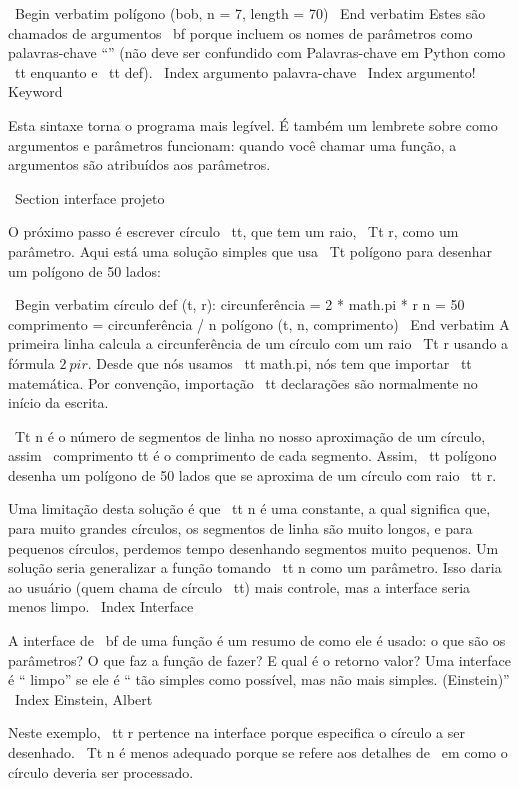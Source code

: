 \documentclass[10pt]{book}
\begin{document}
{\ Begin {verbatim}
polígono (bob, n = 7, length = 70)
\ End {verbatim}
%
Estes são chamados de argumentos {\ bf} porque incluem
os nomes de parâmetros como palavras-chave ``'' (não deve ser confundido com
Palavras-chave em Python como {\ tt enquanto} e {\ tt def}).
\ Index {argumento palavra-chave}
\ Index {argumento! Keyword}

Esta sintaxe torna o programa mais legível. É também um lembrete
sobre como argumentos e parâmetros funcionam: quando você chamar uma função, a
argumentos são atribuídos aos parâmetros.


\ Section {interface} projeto

O próximo passo é escrever {círculo \ tt}, que tem um raio,
{\ Tt r}, como um parâmetro. Aqui está uma solução simples que usa
{\ Tt polígono} para desenhar um polígono de 50 lados:

\ Begin {verbatim}
círculo def (t, r):
    circunferência = 2 * math.pi * r
    n = 50
    comprimento = circunferência / n
    polígono (t, n, comprimento)
\ End {verbatim}
%
A primeira linha calcula a circunferência de um círculo com um raio
{\ Tt r} usando a fórmula $ 2 \ pi r $. Desde que nós usamos {\ tt math.pi}, nós
tem que importar {\ tt matemática}. Por convenção, {importação \ tt} declarações
são normalmente no início da escrita.

{\ Tt n} é o número de segmentos de linha no nosso aproximação de um círculo,
assim {\ comprimento tt} é o comprimento de cada segmento. Assim, {\ tt polígono}
desenha um polígono de 50 lados que se aproxima de um círculo com raio {\ tt r}.

Uma limitação desta solução é que {\ tt n} é uma constante, a qual
significa que, para muito grandes círculos, os segmentos de linha são muito longos, e
para pequenos círculos, perdemos tempo desenhando segmentos muito pequenos. Um
solução seria generalizar a função tomando {\ tt n} como
um parâmetro. Isso daria ao usuário (quem chama de círculo {\ tt})
mais controle, mas a interface seria menos limpo.
\ Index {Interface}

A interface de {\ bf} de uma função é um resumo de como ele é usado: o que
são os parâmetros? O que faz a função de fazer? E qual é o retorno
valor? Uma interface é `` limpo'' se ele é `` tão simples como
possível, mas não mais simples. (Einstein)''
\ Index {Einstein, Albert}

Neste exemplo, {\ tt r} pertence na interface porque
especifica o círculo a ser desenhado. {\ Tt n} é menos adequado
porque se refere aos detalhes de {\ em como} o círculo deveria
ser processado.

}
\end{document}
